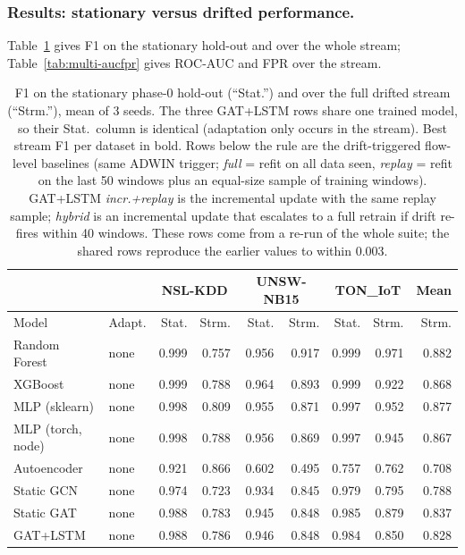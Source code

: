 \documentclass[twocolumn]{llncs}
\begin{document}
\subsubsection{Results: stationary versus drifted performance.} Table~\ref{tab:multi-f1} gives F1
on the stationary hold-out and over the whole stream; Table~\ref{tab:multi-aucfpr} gives ROC-AUC and
FPR over the stream.

\begin{table}[!t]
\centering
\caption{F1 on the stationary phase-0 hold-out (``Stat.'') and over the full drifted stream
(``Strm.''), mean of 3 seeds. The three GAT+LSTM rows share one trained model, so their Stat.\
column is identical (adaptation only occurs in the stream). Best stream F1 per dataset in bold. Rows below the rule are the drift-triggered flow-level baselines (same ADWIN trigger; \emph{full} = refit on all data seen, \emph{replay} = refit on the last 50 windows plus an equal-size sample of training windows). GAT+LSTM \emph{incr.+replay} is the incremental update with the same replay sample; \emph{hybrid} is an incremental update that escalates to a full retrain if drift re-fires within 40 windows. These rows come from a re-run of the whole suite; the shared rows reproduce the earlier values to within 0.003.}
\label{tab:multi-f1}
\small
\setlength{\tabcolsep}{4pt}
\begin{tabular}{|l|l|r|r|r|r|r|r|r|}
\hline
 & & \multicolumn{2}{|c|}{NSL-KDD} & \multicolumn{2}{|c|}{UNSW-NB15} & \multicolumn{2}{|c|}{TON\_IoT} & Mean \\
\hline
Model & Adapt. & Stat. & Strm. & Stat. & Strm. & Stat. & Strm. & Strm. \\
\hline
Random Forest      & none & 0.999 & 0.757 & 0.956 & 0.917 & 0.999 & 0.971 & 0.882 \\
XGBoost            & none & 0.999 & 0.788 & 0.964 & 0.893 & 0.999 & 0.922 & 0.868 \\
MLP (sklearn)      & none & 0.998 & 0.809 & 0.955 & 0.871 & 0.997 & 0.952 & 0.877 \\
MLP (torch, node)  & none & 0.998 & 0.788 & 0.956 & 0.869 & 0.997 & 0.945 & 0.867 \\
Autoencoder        & none & 0.921 & 0.866 & 0.602 & 0.495 & 0.757 & 0.762 & 0.708 \\
Static GCN         & none & 0.974 & 0.723 & 0.934 & 0.845 & 0.979 & 0.795 & 0.788 \\
Static GAT         & none & 0.988 & 0.783 & 0.945 & 0.848 & 0.985 & 0.879 & 0.837 \\
GAT+LSTM           & none & 0.988 & 0.786 & 0.946 & 0.848 & 0.984 & 0.850 & 0.828 \\

\end{tabular}
\end{table}
\end{document}
